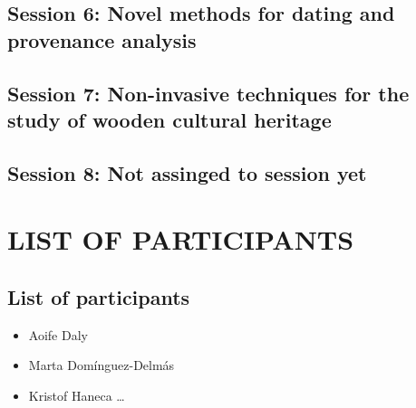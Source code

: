 \documentclass[
]{book}
\providecommand{\tightlist}{%
  \setlength{\itemsep}{0pt}\setlength{\parskip}{0pt}}
\begin{document}
\hypertarget{session-6-novel-methods-for-dating-and-provenance-analysis}{%
\chapter*{Session 6: Novel methods for dating and provenance analysis}\label{session-6-novel-methods-for-dating-and-provenance-analysis}}

\hypertarget{session-7-non-invasive-techniques-for-the-study-of-wooden-cultural-heritage}{%
\chapter*{Session 7: Non-invasive techniques for the study of wooden cultural heritage}\label{session-7-non-invasive-techniques-for-the-study-of-wooden-cultural-heritage}}

\hypertarget{session-8-not-assinged-to-session-yet}{%
\chapter*{Session 8: Not assinged to session yet}\label{session-8-not-assinged-to-session-yet}}

\hypertarget{part-list-of-participants}{%
\part*{LIST OF PARTICIPANTS}\label{part-list-of-participants}}

\hypertarget{list-of-participants}{%
\chapter*{List of participants}\label{list-of-participants}}

\begin{itemize}
\tightlist
\item
  Aoife Daly
\item
  Marta Domínguez-Delmás
\item
  Kristof Haneca \ldots{}
\end{itemize}
\end{document}
